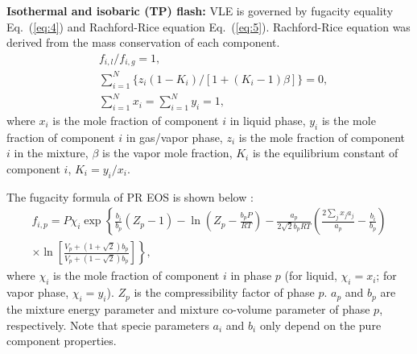 \textbf{Isothermal and isobaric (TP) flash:}
VLE is governed by fugacity equality Eq.~(\ref{eq:4}) and Rachford-Rice equation \cite{rachford1952procedure} Eq.~(\ref{eq:5}). Rachford-Rice equation was derived from the mass conservation of each component.
\begin{align}
	 & f_{i, l}\big/f_{i, g}=1,  \label{eq:4}                                                                        \\
	 & \sum_{i=1}^{N}\bigg\{z_i\left(1-K_i\right)\bigg/\left[1+\left(K_i-1\right)\beta\right]\bigg\}=0, \label{eq:5} \\
	 & \sum_{i=1}^{N}x_i=\sum_{i=1}^{N}y_i=1,  \label{eq:5-2}
\end{align}
where $x_i$ is the mole fraction of component $i$ in liquid phase, $y_i$ is the mole fraction of component $i$ in gas/vapor phase, $z_i$ is the mole fraction of component $i$ in the mixture, $\beta$ is the vapor mole fraction, $K_i$ is the equilibrium constant of component $i$, $K_i=y_i/x_i$. %





The fugacity formula of PR EOS is shown below \cite{yi2019multicomponent}:
\begin{align}
	f_{i,p}=P \chi_i \exp \left\{\frac{b_i}{b_p}(Z_p - 1) - \ln(Z_p-\frac{b_p P}{RT}) - \frac{a_p} {2\sqrt{2} b_p R T} \left(\frac{2 \sum_j {x_j a_j} } {a_p} - \frac {b_i} {b_p}\right) \right. \nonumber \\
	\left.\times \ln\left[\frac{V_p + \left(1+\sqrt{2}\right)b_p} {V_p + \left(1-\sqrt{2}\right) b_p}\right]\right\}, \label{fuga}
\end{align}
where $\chi_i$ is the mole fraction of component $i$ in phase $p$ (for liquid, $\chi_i=x_i$; for vapor phase, $\chi_i=y_i$). $Z_p$ is the compressibility factor of phase $p$. $a_p$ and $b_p$ are the mixture energy parameter and mixture co-volume parameter of phase $p$, respectively. Note that specie parameters $a_i$ and $b_i$ only depend on the pure component properties.

